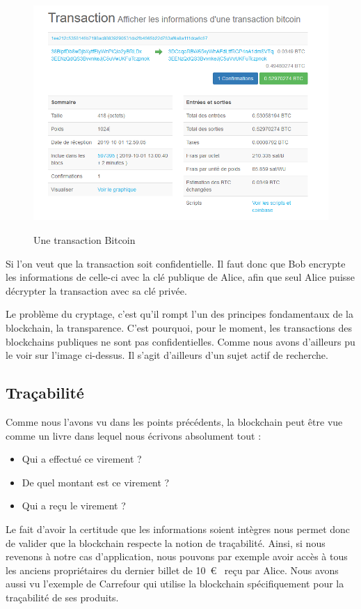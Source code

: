 \documentclass[12pt, a4paper, oneside]{book}
\begin{document}
    \begin{figure}[H]
        \begin{center}
          \includegraphics[width=.9\textwidth]{images/transaction.png}
          \label{fig:transaction}
          \caption{Une transaction Bitcoin}
        \end{center}
    \end{figure}

    Si l’on veut que la transaction soit confidentielle. Il faut donc que Bob encrypte les informations de celle-ci avec la clé publique de Alice, afin que seul Alice puisse décrypter la transaction avec sa clé privée. 
    
    Le problème du cryptage, c’est qu’il rompt l’un des principes fondamentaux de la blockchain, la transparence. C’est pourquoi, pour le moment, les transactions des blockchains publiques ne sont pas confidentielles. Comme nous avons d’ailleurs pu le voir sur l’image ci-dessus. Il s’agit d’ailleurs d’un sujet actif de recherche. 


    \subsection{Traçabilité}
    Comme nous l’avons vu dans les points précédents, la blockchain peut être vue comme un livre dans lequel nous écrivons absolument tout :
    \begin{itemize}
        \item Qui a effectué ce virement ?
        \item De quel montant est ce virement ?
        \item Qui a reçu le virement ?
        \newline
    \end{itemize}
    Le fait d'avoir la certitude que les informations soient intègres nous permet donc de valider que la blockchain respecte la notion de traçabilité. Ainsi, si nous revenons à notre cas d’application, nous pouvons par exemple avoir accès à tous les anciens propriétaires du dernier billet de 10~\euro~ reçu par Alice. Nous avons aussi vu l’exemple de Carrefour qui utilise la blockchain spécifiquement pour la traçabilité de ses produits.
\end{document}
